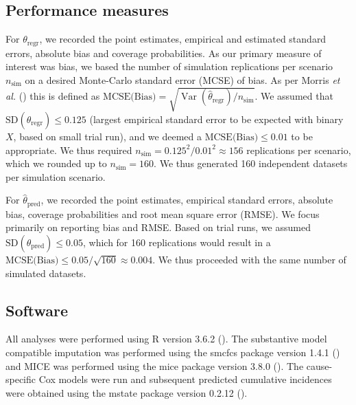 \documentclass[
  letterpaper,
  DIV=11,
  numbers=noendperiod]{scrreprt}
\DeclareMathOperator{\Var}{Var}
\begin{document}
\subsection{Performance measures}\label{performance-measures}

For \(\theta_{\text{regr}}\), we recorded the point estimates, empirical
and estimated standard errors, absolute bias and coverage probabilities.
As our primary measure of interest was bias, we based the number of
simulation replications per scenario \(n_{\text{sim}}\) on a desired
Monte-Carlo standard error (MCSE) of bias. As per Morris \emph{et al.}
() this is defined
as
\(\text{MCSE(Bias)} = \sqrt{\Var(\hat{\theta}_{\text{regr}})/n_{\text{sim}}}\).
We assumed that \(\text{SD}(\hat{\theta}_{\text{regr}})\leq 0.125\)
(largest empirical standard error to be expected with binary \(X\),
based on small trial run), and we deemed a
\(\text{MCSE(Bias)} \leq 0.01\) to be appropriate. We thus required
\(n_{\text{sim}} = 0.125^2 / 0.01^2 \approx 156\) replications per
scenario, which we rounded up to \(n_{\text{sim}} = 160\). We thus
generated 160 independent datasets per simulation scenario.

For \(\hat{\theta}_{\text{pred}}\), we recorded the point estimates,
empirical standard errors, absolute bias, coverage probabilities and
root mean square error (RMSE). We focus primarily on reporting bias and
RMSE. Based on trial runs, we assumed
\(\text{SD}(\hat{\theta}_{\text{pred}})\leq 0.05\), which for 160
replications would result in a
\(\text{MCSE(Bias)} \leq 0.05 / \sqrt{160} \approx 0.004\). We thus
proceeded with the same number of simulated datasets.

\subsection{Software}\label{software}

All analyses were performed using R version 3.6.2
(). The substantive model compatible imputation was performed using
the smcfcs package version 1.4.1
() and MICE was performed using the mice package version 3.8.0
(). The cause-specific Cox models were run and
subsequent predicted cumulative incidences were obtained using the
mstate package version 0.2.12
().
\end{document}
